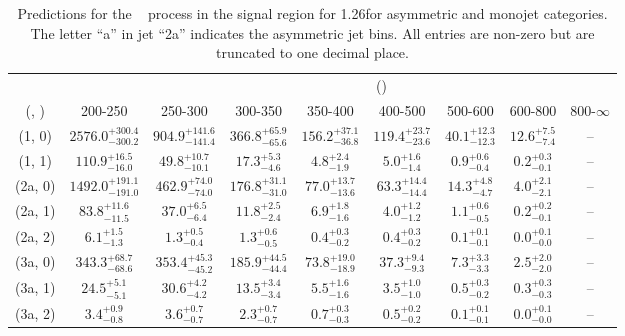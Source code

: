 \begin{table}[h!]
\tiny
\centering
\caption{Predictions for the \zInv~ process in the signal region for 1.26\ifb for asymmetric and monojet categories. The letter ``a'' in jet \eg ``2a''  indicates the asymmetric jet bins. All entries are non-zero but are truncated to one decimal place.\label{tab:predsep_zinv_sig_asym}}
\begin{tabular}
{ccccccccc}
	\hline\hline
&	& \multicolumn{8}{c}{\scalht (\gev)} \\ 
	 (\njet,  \nb) & 200-250 & 250-300 & 300-350 & 350-400 & 400-500 & 500-600 & 600-800 & 800-$\infty$ \\ [0.8ex] 
\hline
	(1, 0) & $2576.0^{+ 300.4 }_{- 300.2 }$ & $904.9^{+ 141.6 }_{- 141.4 }$ & $366.8^{+ 65.9 }_{- 65.6 }$ & $156.2^{+ 37.1 }_{- 36.8 }$ & $119.4^{+ 23.7 }_{- 23.6 }$ & $40.1^{+ 12.3 }_{- 12.3 }$ & $12.6^{+ 7.5 }_{- 7.4 }$ & -- \\[0.5ex] 
	(1, 1) & $110.9^{+ 16.5 }_{- 16.0 }$ & $49.8^{+ 10.7 }_{- 10.1 }$ & $17.3^{+ 5.3 }_{- 4.6 }$ & $4.8^{+ 2.4 }_{- 1.9 }$ & $5.0^{+ 1.6 }_{- 1.4 }$ & $0.9^{+ 0.6 }_{- 0.4 }$ & $0.2^{+ 0.3 }_{- 0.1 }$ & -- \\[0.5ex] 
	(2a, 0) & $1492.0^{+ 191.1 }_{- 191.0 }$ & $462.9^{+ 74.0 }_{- 74.0 }$ & $176.8^{+ 31.1 }_{- 31.0 }$ & $77.0^{+ 13.7 }_{- 13.6 }$ & $63.3^{+ 14.4 }_{- 14.4 }$ & $14.3^{+ 4.8 }_{- 4.7 }$ & $4.0^{+ 2.1 }_{- 2.1 }$ & -- \\[0.5ex] 
	(2a, 1) & $83.8^{+ 11.6 }_{- 11.5 }$ & $37.0^{+ 6.5 }_{- 6.4 }$ & $11.8^{+ 2.5 }_{- 2.4 }$ & $6.9^{+ 1.8 }_{- 1.6 }$ & $4.0^{+ 1.2 }_{- 1.2 }$ & $1.1^{+ 0.6 }_{- 0.5 }$ & $0.2^{+ 0.2 }_{- 0.1 }$ & -- \\[0.5ex] 
	(2a, 2) & $6.1^{+ 1.5 }_{- 1.3 }$ & $1.3^{+ 0.5 }_{- 0.4 }$ & $1.3^{+ 0.6 }_{- 0.5 }$ & $0.4^{+ 0.3 }_{- 0.2 }$ & $0.4^{+ 0.3 }_{- 0.2 }$ & $0.1^{+ 0.1 }_{- 0.1 }$ & $0.0^{+ 0.1 }_{- 0.0 }$ & -- \\[0.5ex] 
	(3a, 0) & $343.3^{+ 68.7 }_{- 68.6 }$ & $353.4^{+ 45.3 }_{- 45.2 }$ & $185.9^{+ 44.5 }_{- 44.4 }$ & $73.8^{+ 19.0 }_{- 18.9 }$ & $37.3^{+ 9.4 }_{- 9.3 }$ & $7.3^{+ 3.3 }_{- 3.3 }$ & $2.5^{+ 2.0 }_{- 2.0 }$ & -- \\[0.5ex] 
	(3a, 1) & $24.5^{+ 5.1 }_{- 5.1 }$ & $30.6^{+ 4.2 }_{- 4.2 }$ & $13.5^{+ 3.4 }_{- 3.4 }$ & $5.5^{+ 1.6 }_{- 1.6 }$ & $3.5^{+ 1.0 }_{- 1.0 }$ & $0.5^{+ 0.3 }_{- 0.2 }$ & $0.3^{+ 0.3 }_{- 0.3 }$ & -- \\[0.5ex] 
	(3a, 2) & $3.4^{+ 0.9 }_{- 0.8 }$ & $3.6^{+ 0.7 }_{- 0.7 }$ & $2.3^{+ 0.7 }_{- 0.7 }$ & $0.7^{+ 0.3 }_{- 0.3 }$ & $0.5^{+ 0.2 }_{- 0.2 }$ & $0.1^{+ 0.1 }_{- 0.1 }$ & $0.0^{+ 0.1 }_{- 0.0 }$ & -- \\[0.5ex] 

\end{tabular}
\end{table}
